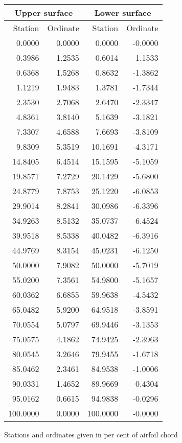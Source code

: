 \documentclass[11pt]{book}
\begin{document}
 \hspace{4mm}
 \begin{tabular}{|r|r|r|r|} \hline 
 \multicolumn{2}{|c|}{Upper surface} & \multicolumn{2}{|c|}{Lower surface} \\
 \hline
 Station & Ordinate & Station & Ordinate \\
 \hline
0.0000 & 0.0000 & 0.0000 & -0.0000 \\
0.3986 & 1.2535 & 0.6014 & -1.1533 \\
0.6368 & 1.5268 & 0.8632 & -1.3862 \\
1.1219 & 1.9483 & 1.3781 & -1.7344 \\
2.3530 & 2.7068 & 2.6470 & -2.3347 \\
4.8361 & 3.8140 & 5.1639 & -3.1821 \\
7.3307 & 4.6588 & 7.6693 & -3.8109 \\
9.8309 & 5.3519 & 10.1691 & -4.3171 \\
14.8405 & 6.4514 & 15.1595 & -5.1059 \\
19.8571 & 7.2729 & 20.1429 & -5.6800 \\
24.8779 & 7.8753 & 25.1220 & -6.0853 \\
29.9014 & 8.2841 & 30.0986 & -6.3396 \\
34.9263 & 8.5132 & 35.0737 & -6.4524 \\
39.9518 & 8.5338 & 40.0482 & -6.3916 \\
44.9769 & 8.3154 & 45.0231 & -6.1250 \\
50.0000 & 7.9082 & 50.0000 & -5.7019 \\
55.0200 & 7.3561 & 54.9800 & -5.1657 \\
60.0362 & 6.6855 & 59.9638 & -4.5432 \\
65.0482 & 5.9200 & 64.9518 & -3.8591 \\
70.0554 & 5.0797 & 69.9446 & -3.1353 \\
75.0575 & 4.1862 & 74.9425 & -2.3963 \\
80.0545 & 3.2646 & 79.9455 & -1.6718 \\
85.0462 & 2.3461 & 84.9538 & -1.0006 \\
90.0331 & 1.4652 & 89.9669 & -0.4304 \\
95.0162 & 0.6615 & 94.9838 & -0.0296 \\
100.0000 & 0.0000 & 100.0000 & -0.0000 \\
 \hline 
 \end{tabular}
 \vspace{8mm}

Stations and ordinates given in per cent of airfoil chord
\end{document}
